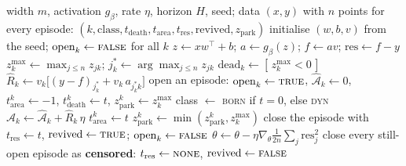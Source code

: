 \documentclass[11pt]{article}
\theoremstyle{definition}
\theoremstyle{remark}
\newcommand{\Ar}{\mathcal{A}}                      %
\begin{document}
\begin{algorithm}[h]
\caption{Ground-truth area clock (deterministic MLP, $T=0$)}
\label{alg:regua}
\begin{algorithmic}[1]
\REQUIRE width $m$, activation $g_\beta$, rate $\eta$, horizon $H$, seed; data
$(x,y)$ with $n$ points
\ENSURE for every episode: $(k,\text{class},t_{\mathrm{death}},
t_{\mathrm{area}},t_{\mathrm{res}},\text{revived},z_{\mathrm{park}})$
\STATE initialise $(w,b,v)$ from the seed; $\mathrm{open}_k\leftarrow\textsc{false}$ for all $k$
  \STATE $z\leftarrow xw^\top+b$; \; $a\leftarrow g_\beta(z)$; \;
         $f\leftarrow av$; \; $\mathrm{res}\leftarrow f-y$
  \STATE $z^{\max}_k\leftarrow\max_{j\le n}z_{jk}$; \;
         $j^\ast_k\leftarrow\arg\max_{j\le n}z_{jk}$
  \STATE $\mathrm{dead}_k\leftarrow[\,z^{\max}_k<0\,]$
  \STATE $\hat R_k\leftarrow v_k\bigl[(y-f)_{j^\ast_k}+v_k\,a_{j^\ast_k k}\bigr]$
    \STATE open an episode: $\mathrm{open}_k\leftarrow\textsc{true}$,
           $\hat{\Ar}_k\leftarrow0$, $t_{\mathrm{area}}^{k}\leftarrow-1$,
           $t_{\mathrm{death}}^{k}\leftarrow t$,
           $z^k_{\mathrm{park}}\leftarrow z^{\max}_k$
    \STATE class $\leftarrow$ \textsc{born} if $t=0$, else \textsc{dyn}
  \ENDFOR
    \STATE $\hat{\Ar}_k\leftarrow\hat{\Ar}_k+\hat R_k\,\eta$
    \IF{$t_{\mathrm{area}}^{k}<0$ \AND $\hat{\Ar}_k>0$}
      \STATE $t_{\mathrm{area}}^{k}\leftarrow t$ 
    \ENDIF
    \STATE $z^k_{\mathrm{park}}\leftarrow\min(z^k_{\mathrm{park}},z^{\max}_k)$
  \ENDFOR
    \STATE close the episode with $t_{\mathrm{res}}\leftarrow t$,
           $\text{revived}\leftarrow\textsc{true}$;
           $\mathrm{open}_k\leftarrow\textsc{false}$
  \ENDFOR
  \STATE $\theta\leftarrow\theta-\eta\nabla_\theta\tfrac1{2n}\sum_j\mathrm{res}_j^2$
\ENDFOR
\STATE close every still-open episode as \textbf{censored}:
       $t_{\mathrm{res}}\leftarrow\textsc{none}$,
       $\text{revived}\leftarrow\textsc{false}$
\end{algorithmic}
\end{algorithm}
\end{document}
